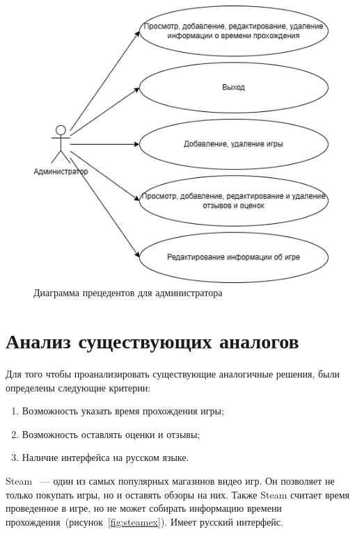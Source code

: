 \begin{figure}[h!]
	\begin{center}
		\includegraphics[scale=0.8]{../imgs/admin.png}
	\end{center}
	\captionsetup{justification=centering}
	\caption{Диаграмма прецедентов для администратора}
	\label{img:ucadmin}
\end{figure}


\section{Анализ существующих аналогов}\label{criteria}

Для того чтобы проанализировать существующие аналогичные решения, были определены следующие критерии:

\begin{enumerate}
	\item Возможность указать время прохождения игры;
	\item Возможность оставлять оценки и отзывы;
	\item Наличие интерфейса на русском языке.
\end{enumerate}

Steam~\cite{steam} --- один из самых популярных магазинов видео игр. Он позволяет не только покупать игры, но и оставять обзоры на них. Также Steam считает время проведенное в игре, но не может собирать информацию времени прохождения~(рисунок~\ref{fig:steamex}). Имеет русский интерфейс.

